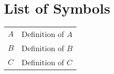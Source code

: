 
\chapter*{List of Symbols}
{}


\vspace*{0.5cm}
\noindent
\begin{tabular}{p{} p{}}
$A$ & Definition of $A$\\[2mm]
$B$ & Definition of $B$\\[2mm]
$C$ & Definition of $C$\\[2mm]
\end{tabular}